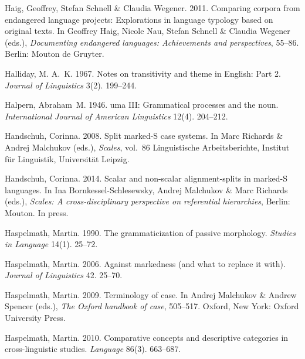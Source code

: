 \documentclass[ number=1
			   ,series=sidl
				,url=http://langsci-press.org/catalog/book/18 
			   ,isbn=978-3-944675-19-0
			   ,output=long   %
			  ]{LSP/langsci}
\begin{document}
\begin{thebibliography}{190}
Haig, Geoffrey, Stefan Schnell \& Claudia Wegener. 2011.
\newblock Comparing corpora from endangered language projects: {E}xplorations
  in language typology based on original texts.
\newblock In Geoffrey Haig, Nicole Nau, Stefan Schnell \& Claudia Wegener
  (eds.), \emph{Documenting endangered languages: {A}chievements and
  perspectives}, 55--86. Berlin: Mouton de Gruyter.

Halliday, M. A.~K. 1967.
\newblock Notes on transitivity and theme in {E}nglish: {P}art 2.
\newblock \emph{Journal of Linguistics} 3(2). 199--244.

Halpern, Abraham~M. 1946.
uma {III}: {G}rammatical processes and the noun.
\newblock \emph{International Journal of American Linguistics} 12(4). 204--212.

Handschuh, Corinna. 2008.
\newblock Split marked-{S} case systems.
\newblock In Marc Richards \& Andrej Malchukov (eds.), \emph{Scales}, vol.~86
  Linguistische Arbeitsberichte, Institut f{\"u}r Linguistik, Universit{\"a}t
  Leipzig.

Handschuh, Corinna. 2014.
\newblock Scalar and non-scalar alignment-splits in marked-{S} languages.
\newblock In Ina Bornkessel-Schlesewsky, Andrej Malchukov \& Marc Richards
  (eds.), \emph{Scales: A cross-disciplinary perspective on referential
  hierarchies}, Berlin: Mouton.
\newblock In press.

Haspelmath, Martin. 1990.
\newblock The grammaticization of passive morphology.
\newblock \emph{Studies in Language} 14(1). 25--72.

Haspelmath, Martin. 2006.
\newblock Against markedness (and what to replace it with).
\newblock \emph{Journal of Linguistics} 42. 25--70.

Haspelmath, Martin. 2009.
\newblock Terminology of case.
\newblock In Andrej Malchukov \& Andrew Spencer (eds.), \emph{The {O}xford
  handbook of case}, 505--517. Oxford, New York: Oxford University Press.

Haspelmath, Martin. 2010.
\newblock Comparative concepts and descriptive categories in cross-linguistic
  studies.
\newblock \emph{Language} 86(3). 663--687.


\end{thebibliography}
\end{document}
